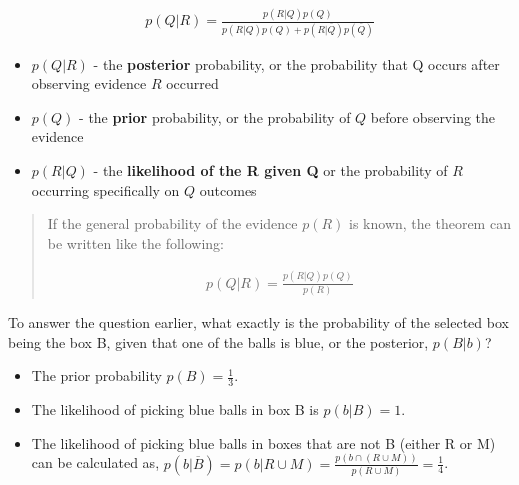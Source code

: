 \[
\begin{aligned}
p(Q|R)=\frac{p(R|Q)p(Q)}{p(R|Q)p(Q)+p(R|\overline{Q})p(\overline{Q})}
\end{aligned}
\]

\begin{itemize}
\tightlist
\item
  \textbf{\(p(Q|R)\)} - the \textbf{posterior} probability, or the
  probability that Q occurs after observing evidence \textbf{\(R\)}
  occurred
\item
  \textbf{\(p(Q)\)} - the \textbf{prior} probability, or the probability
  of \textbf{\(Q\)} before observing the evidence
\item
  \textbf{\(p(R|Q)\)} - the \textbf{likelihood of the R given Q} or the
  probability of \textbf{\(R\)} occurring specifically on \textbf{\(Q\)}
  outcomes
\end{itemize}

\begin{quote}
If the general probability of the evidence \textbf{\(p(R)\)} is known,
the theorem can be written like the following:

\[
\begin{aligned}
p(Q|R)=\frac{p(R|Q)p(Q)}{p(R)}
\end{aligned}
\]
\end{quote}

To answer the question earlier, what exactly is the probability of the
selected box being the box B, given that one of the balls is blue, or
the posterior, \textbf{\(p(B|b)\)}?

\begin{itemize}
\item
  The prior probability \textbf{\(p(B)=\frac{1}{3}\)}.
\item
  The likelihood of picking blue balls in box B is
  \textbf{\(p(b|B)=1\)}.
\item
  The likelihood of picking blue balls in boxes that are not B (either R
  or M) can be calculated as,
  \textbf{\(p(b|\overline{B})=p(b|R \cup M) = \frac{p(b \cap (R \cup M))}{p(R \cup M)} = \frac{1}{4}\)}.
\end{itemize}

